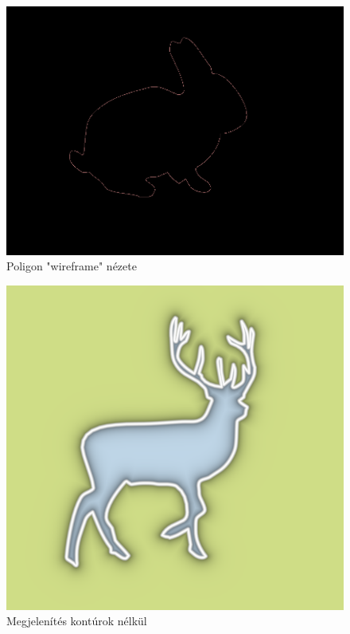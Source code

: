 \begin{figure}[H]
    \centering
    \includegraphics[width=0.85\linewidth]{images/outline_only.png}
    \caption{Poligon "wireframe" nézete}
    \label{fig:outline_only-1}
\end{figure}

\begin{figure}[H]
    \centering
    \includegraphics[width=0.78\linewidth]{images/hidden_contours.png}
    \caption{Megjelenítés kontúrok nélkül}
    \label{fig:hidden_contours-1}
\end{figure}


